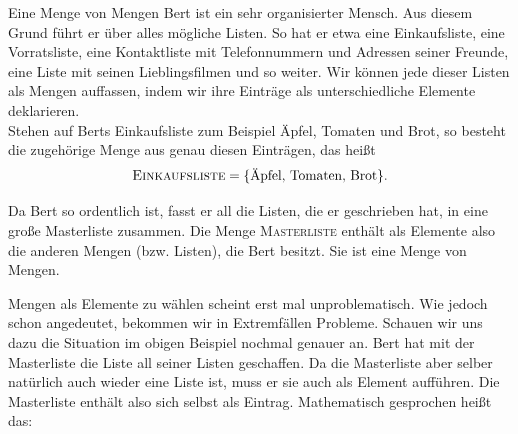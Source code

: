 \documentclass[../../main.tex]{subfiles}
\begin{document}
\begin{example}{Eine Menge von Mengen}
	Bert ist ein sehr organisierter Mensch. Aus diesem Grund führt er über alles mögliche Listen. So hat er etwa eine Einkaufsliste, eine Vorratsliste, eine Kontaktliste mit Telefonnummern und Adressen seiner Freunde, eine Liste mit seinen Lieblingsfilmen und so weiter. Wir können jede dieser Listen als Mengen auffassen, indem wir ihre Einträge als unterschiedliche Elemente deklarieren.\\
	
	Stehen auf Berts Einkaufsliste zum Beispiel	Äpfel, Tomaten und Brot, so besteht die zugehörige Menge aus genau diesen Einträgen, das heißt $$\textsc{Einkaufsliste} = \{\text{Äpfel, Tomaten, Brot}\}.$$
	
	Da Bert so ordentlich ist, fasst er all die Listen, die er geschrieben hat, in eine große Masterliste zusammen. Die Menge \textsc{Masterliste} enthält als Elemente also die anderen Mengen (bzw. Listen), die Bert besitzt. Sie ist eine Menge von Mengen.	
\end{example}

Mengen als Elemente zu wählen scheint erst mal unproblematisch. Wie jedoch schon angedeutet, bekommen wir in Extremfällen Probleme. Schauen wir uns dazu die Situation im obigen Beispiel nochmal genauer an. Bert hat mit der Masterliste die Liste all seiner Listen geschaffen. Da die Masterliste aber selber natürlich auch wieder eine Liste ist, muss er sie auch als Element aufführen. Die Masterliste enthält also sich selbst als Eintrag. Mathematisch gesprochen heißt das:
\end{document}
